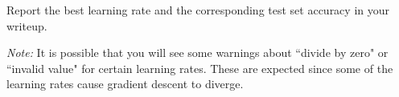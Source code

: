 Report the best learning rate and the corresponding test set accuracy in your writeup.

\emph{Note:} It is possible that you will see some warnings about ``divide by zero" or ``invalid value" for certain learning rates. These are expected since
some of the learning rates cause gradient descent to diverge.
\\
